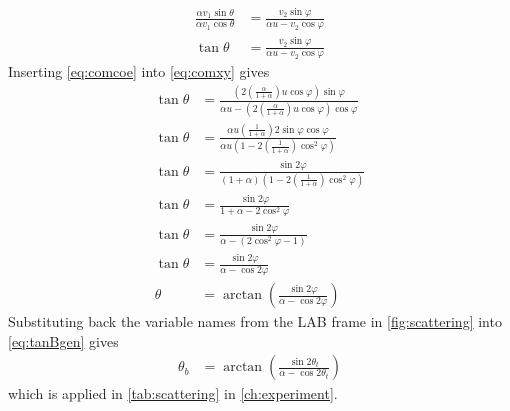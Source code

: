 \documentclass[twoside,english]{uiofysmaster/uiofysmaster}
\let\orgautoref\autoref
\renewcommand{\autoref}
        {%
		 \def\sectionautorefname{Section}%
		 \def\subsectionautorefname{Section}%
		 \def\subsubsectionautorefname{Section}%
		 \def\chapterautorefname{Chapter}%
          \orgautoref}
\begin{document}
\begin{appendices}
\begin{align}\label{eq:comxy}
	\frac{\alpha v_1 \sin \theta}{\alpha v_1 \cos \theta} &= \frac{v_2 \sin \varphi}{\alpha u - v_2 \cos \varphi}  \nonumber\\
	\tan \theta &= \frac{v_2 \sin \varphi}{\alpha u - v_2 \cos \varphi}
\end{align}
Inserting \autoref{eq:comcoe} into \autoref{eq:comxy} gives
\begin{align}\label{eq:tanBgen}
	\tan \theta &= \frac{\left( 2 \left( \frac{\alpha}{1 + \alpha} \right) u \cos \varphi  \right) \sin \varphi}{\alpha u - \left( 2 \left( \frac{\alpha}{1 + \alpha} \right) u \cos \varphi  \right) \cos \varphi}  \nonumber\\
	\tan \theta &= \frac{\alpha u \left( \frac{1}{1 + \alpha} \right) 2 \sin \varphi \cos \varphi}{\alpha u \left(1 - 2 \left( \frac{1}{1 + \alpha} \right) \cos^2 \varphi \right)}  \nonumber\\
	\tan \theta &= \frac{\sin 2\varphi}{(1 + \alpha)\left(1 - 2 \left( \frac{1}{1 + \alpha} \right) \cos^2 \varphi \right)}  \nonumber\\
	\tan \theta &= \frac{\sin 2\varphi}{1 + \alpha - 2 \cos^2 \varphi}  \nonumber\\
	\tan \theta &= \frac{\sin 2\varphi}{\alpha - (2 \cos^2 \varphi - 1)}  \nonumber\\
	\tan \theta &= \frac{\sin 2\varphi}{\alpha - \cos 2\varphi}  \nonumber\\
	\theta &= \arctan \left( \frac{\sin 2\varphi}{\alpha - \cos 2\varphi} \right)
\end{align}
Substituting back the variable names from the LAB frame in \autoref{fig:scattering} into \autoref{eq:tanBgen} gives
\begin{align}\label{eq:tanB}
	\theta_b &= \arctan \left( \frac{\sin 2\theta_t}{\alpha - \cos 2\theta_t} \right)
\end{align}
which is applied in \autoref{tab:scattering} in \autoref{ch:experiment}.



\end{appendices}
\end{document}
